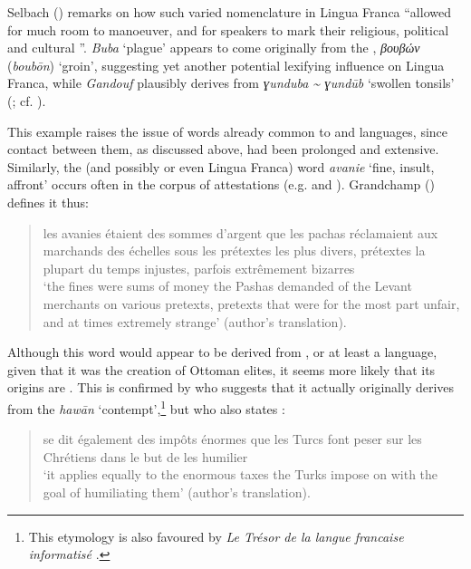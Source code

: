 \documentclass[output=paper]{langsci/langscibook}
\begin{document}
	Selbach (\citeyear[44]{Selbach2008}) remarks on how such varied nomenclature in Lingua Franca ``allowed for much room to manoeuver, and for speakers to mark their religious, political and cultural ''. \textit{Buba} ‘plague’ appears to come originally from the , \textit{βουβών} (\textit{boubōn}) ‘groin’, suggesting yet another potential lexifying influence on Lingua Franca, while \textit{Gandouf} plausibly derives from  \textit{ɣunduba {\textasciitilde} ɣundūb} ‘swollen tonsils’ (\citealt[72]{Schuchardt1909}; cf. \citealt[45]{Selbach2008}). 
	
	\hspace*{-0.66455pt}This example raises the issue of words already common to  and  languages, since contact between them, as discussed above, had been prolonged and extensive. Similarly, the  (and possibly  or even Lingua Franca) word \textit{avanie} ‘fine, insult, affront’ occurs often in the corpus of attestations (e.g. \citealt{Pananti1841} and \citealt{Grandchamp1920}). Grandchamp (\citeyear[xiii]{Grandchamp1920}) defines it thus: 
	
	\begin{quote}
		les avanies étaient des sommes d'argent que les pachas réclamaient aux marchands des échelles sous les prétextes les plus divers, prétextes la plupart du temps injustes, parfois extrêmement bizarres\medskip\\
		‘the fines were sums of money the Pashas demanded of the Levant merchants on various pretexts, pretexts that were for the most part unfair, and at times extremely strange’ (author's translation).
	\end{quote}
	
	Although this word would appear to be derived from , or at least a  language, given that it was the creation of Ottoman elites, it seems more likely that its origins are . This is confirmed by \citet{Pihan1847} who suggests that it actually originally derives from the  \textit{hawān} ‘contempt’,\footnote{This etymology is also favoured by \textit{Le Trésor de la langue francaise informatisé} \citep{Dendien1994}.} but who also states \citep[46]{Pihan1847}:
	
	\begin{quote}
		se dit également des impôts énormes que les Turcs font peser sur les Chrétiens dans le but de les humilier\medskip\\
		‘it applies equally to the enormous taxes the Turks impose on  with the goal of humiliating them’ (author's translation).
	\end{quote}
	
\end{document}
